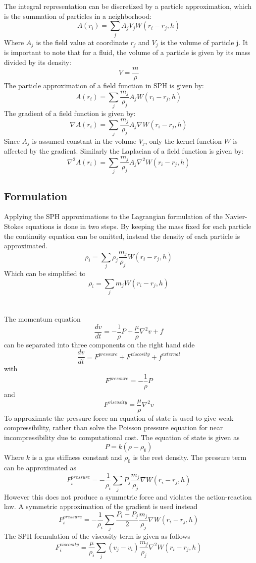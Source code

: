 The integral representation can be discretized by a particle approximation, which is the summation of particles in a neighborhood:
$$
A(r_i) = \sum_j A_j V_j W(r_i-r_j, h)
$$
Where $A_j$ is the field value at coordinate $r_j$ and $V_j$ is the volume of
particle j. It is important to note that for a fluid, the volume of a particle is given by
its mass divided by its density:
$$
V = \frac{m}{\rho}
$$
The particle approximation of a field function in SPH is given by:
$$
A(r_i) = \sum_j \frac{m_j}{\rho_j} A_j W(r_i - r_j, h)
$$ 
The gradient of a field function is given by:
$$
\nabla A(r_i) = \sum_j \frac{m_j}{\rho_j} A_j \nabla W(r_i - r_j, h)
$$
Since $A_j$ is assumed constant in the volume $V_j$, only the kernel function
$W$ is affected by the gradient. Similarly the Laplacian of a field function is
given by:
$$
\nabla^2 A(r_i) = \sum_j \frac{m_j}{\rho_j} A_j \nabla^2 W(r_i - r_j, h)
$$


\subsection{Formulation}

Applying the SPH approximations to the Lagrangian formulation of the
Navier-Stokes equations is done in two steps. By keeping the mass fixed for each
particle the continuity equation can be omitted, instead the density of each particle is approximated.
$$
\rho_i = \sum_j \rho_j \frac{m_j}{\rho_j} W(r_i - r_j, h)
$$
Which can be simplified to
$$
\rho_i = \sum_j m_j W(r_i - r_j, h)
$$
\\
\\
The momentum equation
$$
\frac{dv}{dt} = -\frac{1}{\rho}P + \frac{\mu}{\rho} \nabla^2 v + f
$$
can be separated into three components on the right hand side
$$ \frac{dv}{dt} = F^{pressure} + F^{viscosity} + f^{external} $$
with
$$
F^{pressure} = -\frac{1}{\rho}P
$$
and
$$
F^{viscosity} = \frac{\mu}{\rho} \nabla^2 v
$$
To approximate the pressure force an equation of state is used to give weak
compressibility, rather than solve the Poisson pressure equation for near
incompressibility due to computational cost.
The equation of state is given as 
$$
P = k(\rho - \rho_0)
$$
Where $k$ is a gas stiffness constant and $\rho_0$ is the rest density.
The pressure term can be approximated as
$$
F^{pressure}_i = -\frac{1}{\rho_i} \sum_j P_j \frac{m_j}{\rho_j} \nabla W(r_i - r_j, h)
$$
However this does not produce a symmetric force and violates the action-reaction law. A symmetric approximation of the gradient is used instead
$$
F^{pressure}_i = -\frac{1}{\rho_i} \sum_j \frac{P_i + P_j}{2} \frac{m_j}{\rho_j} \nabla W(r_i - r_j, h)
$$
The SPH formulation of the viscosity term is given as follows
$$
F^{viscosity}_i = \frac{\mu}{\rho_i} \sum_j (v_j - v_i) \frac{m_j}{\rho_j} \nabla^2 W(r_i - r_j, h)
$$


